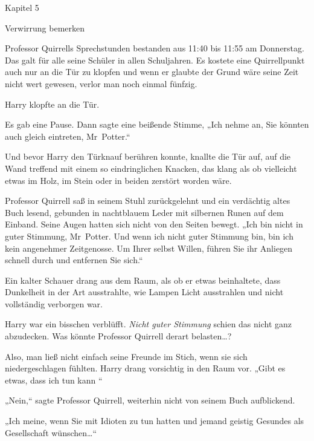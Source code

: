 

\hypertarget{verwirrung-bemerken}{%

Kapitel 5

Verwirrung bemerken

Professor Quirrells Sprechstunden bestanden aus 11:40 bis 11:55 am Donnerstag. Das galt für alle seine Schüler in allen Schuljahren. Es kostete eine Quirrellpunkt auch nur an die Tür zu klopfen und wenn er glaubte der Grund wäre seine Zeit nicht wert gewesen, verlor man noch einmal fünfzig.

Harry klopfte an die Tür.

Es gab eine Pause. Dann sagte eine beißende Stimme, „Ich nehme an, Sie könnten auch gleich eintreten, Mr~Potter.“

Und bevor Harry den Türknauf berühren konnte, knallte die Tür auf, auf die Wand treffend mit einem so eindringlichen Knacken, das klang als ob vielleicht etwas im Holz, im Stein oder in beiden zerstört worden wäre.

Professor Quirrell saß in seinem Stuhl zurückgelehnt und ein verdächtig altes Buch lesend, gebunden in nachtblauem Leder mit silbernen Runen auf dem Einband. Seine Augen hatten sich nicht von den Seiten bewegt. „Ich bin nicht in guter Stimmung, Mr~Potter. Und wenn ich nicht guter Stimmung bin, bin ich kein angenehmer Zeitgenosse. Um Ihrer selbst Willen, führen Sie ihr Anliegen schnell durch und entfernen Sie sich.“

Ein kalter Schauer drang aus dem Raum, als ob er etwas beinhaltete, dass Dunkelheit in der Art ausstrahlte, wie Lampen Licht ausstrahlen und nicht vollständig verborgen war.

Harry war ein bisschen verblüfft. \emph{Nicht guter Stimmung} schien das nicht ganz abzudecken. Was könnte Professor Quirrell derart belasten…?

Also, man ließ nicht einfach seine Freunde im Stich, wenn sie sich niedergeschlagen fühlten. Harry drang vorsichtig in den Raum vor. „Gibt es etwas, dass ich tun kann \later“

„Nein,“ sagte Professor Quirrell, weiterhin nicht von seinem Buch aufblickend.

„Ich meine, wenn Sie mit Idioten zu tun hatten und jemand geistig Gesundes als Gesellschaft wünschen…“

}
